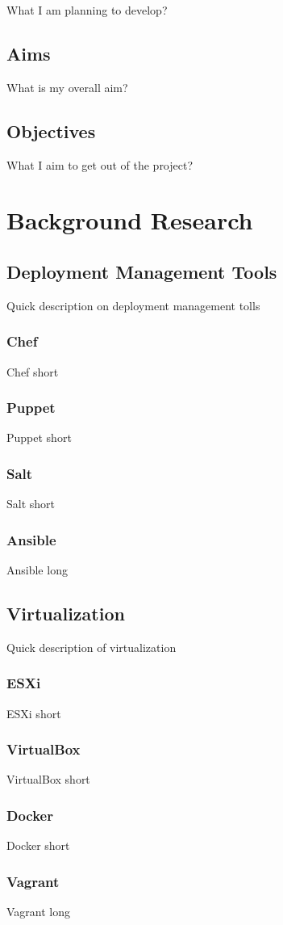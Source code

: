 \documentclass[12pt,a4paper]{report}
\begin{document}
What I am planning to develop?
\section{Aims}
What is my overall aim?
\section{Objectives}
What I aim to get out of the project?

\chapter{Background Research}

\section{Deployment Management Tools}
Quick description on deployment management tolls
\subsection{Chef}
Chef short
\subsection{Puppet}
Puppet short
\subsection{Salt}
Salt short
\subsection{Ansible}
Ansible long
\section{Virtualization}
Quick description of virtualization
\subsection{ESXi}
ESXi short
\subsection{VirtualBox}
VirtualBox short
\subsection{Docker}
Docker short
\subsection{Vagrant}
Vagrant long
\end{document}
